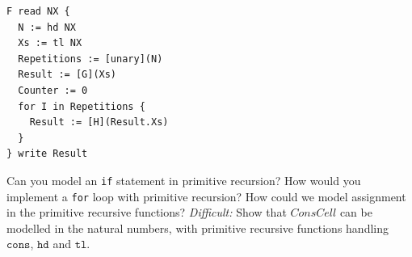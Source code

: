 \begin{verbatim}
F read NX {
  N := hd NX
  Xs := tl NX
  Repetitions := [unary](N)
  Result := [G](Xs)
  Counter := 0
  for I in Repetitions {
    Result := [H](Result.Xs)
  }
} write Result
\end{verbatim}

\begin{Exercise}[title={\FOR computable functions are primitive recursive}]
	\Question Can you model an {\tt if} statement in primitive recursion?
	\Question How would you implement a {\tt for} loop with primitive recursion?
	\Question How could we model assignment in the primitive recursive functions?
	\Question \emph{Difficult:} Show that $ConsCell$ can be modelled in the 
		natural numbers, with primitive recursive functions handling $\mathtt{cons}$, 
		$\mathtt{hd}$ and $\mathtt{tl}$.
\end{Exercise}
